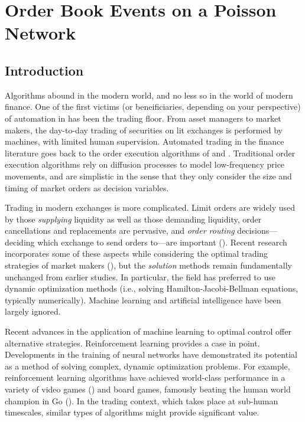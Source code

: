 \chapter{Order Book Events on a Poisson Network}
\label{chapter:four}


\section{Introduction}
	Algorithms abound in the modern world, and no less so in the world of modern finance. One of the first victims (or beneificiaries, depending on your perspective) of automation in has been the trading floor. From asset managers to market makers, the day-to-day trading of securities on lit exchanges is performed by machines, with limited human supervision. Automated trading in the finance literature goes back to the order execution algorithms of \cite{Almgren2000} and \cite{Bertsimas1998}. Traditional order execution algorithms rely on diffusion processes to model low-frequency price movements, and are simplistic in the sense that they only consider the size and timing of market orders as decision variables.

	Trading in modern exchanges is more complicated. Limit orders are widely used by those \textit{supplying} liquidity as well as those demanding liquidity, order cancellations and replacements are pervasive, and \textit{order routing} decisions---deciding which exchange to send orders to---are important (\cite{Cont2017}). Recent research incorporates some of these aspects while considering the optimal trading strategies of market makers (\cite{Guilbaud2013, Xu2015}), but the \textit{solution} methods remain fundamentally unchanged from earlier studies. In particular, the field has preferred to use dynamic optimization methods (i.e., solving Hamilton-Jacobi-Bellman equations, typically numerically). Machine learning and artificial intelligence have been largely ignored.

	Recent advances in the application of machine learning to optimal control offer alternative strategies. Reinforcement learning provides a case in point. Developments in the training of neural networks have demonstrated its potential as a method of solving complex, dynamic optimization problems. For example, reinforcement learning algorithms have achieved world-class performance in a variety of video games (\cite{Mnih2015}) and board games, famously beating the human world champion in Go (\cite{Silver2017}). In the trading context, which takes place at sub-human timescales, similar types of algorithms might provide significant value.

